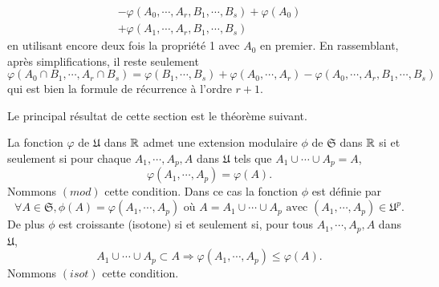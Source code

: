 \begin{demo}
\begin{enumerate}
\begin{align*}
       - \varphi(A_0, \cdots, A_r,B_1, \cdots, B_s) + \varphi(A_0) \\
       + \varphi(A_1, \cdots, A_r,B_1, \cdots, B_s)
    \end{align*}
    en utilisant encore deux fois la propriété 1 avec $A_0$ en premier. En rassemblant, après simplifications, il reste seulement
    \begin{displaymath}
      \varphi(A_0\cap B_1, \cdots, A_r \cap B_s)
      = \varphi( B_1, \cdots , B_s) + \varphi(A_0, \cdots, A_r) - \varphi(A_0, \cdots, A_r,B_1, \cdots, B_s)
    \end{displaymath}
    qui est bien la formule de récurrence à l'ordre $r+1$.
  \end{enumerate}
\end{demo}
Le principal résultat de cette section est le théorème suivant.
\begin{thm}
  La fonction $\varphi$ de $\mathfrak{U}$ dans $\mathbb{R}$ admet une extension modulaire $\phi$ de $\mathfrak{S}$ dans $\mathbb{R}$ si et seulement si pour chaque $A_1, \cdots,A_p,A$ dans $\mathfrak{U}$ tels que $A_1 \cup \cdots \cup A_p = A$,
  \begin{displaymath}
    \varphi(A_1, \cdots,A_p) = \varphi(A).
  \end{displaymath}
  Nommons $(mod)$ cette condition. Dans ce cas la fonction $\phi$ est définie par
  \begin{displaymath}
    \forall A \in \mathfrak{S}, \phi(A) = \varphi(A_1,\cdots, A_p) \text{ où } A = A_1 \cup \cdots \cup A_p \text{ avec }(A_1,\cdots,A_p) \in \mathfrak{U}^p.
  \end{displaymath}
  De plus $\phi$ est croissante (isotone) si et seulement si, pour tous $A_1, \cdots, A_p, A$ dans $\mathfrak{U}$,
  \begin{displaymath}
    A_1 \cup \cdots \cup A_p \subset A \Rightarrow \varphi(A_1, \cdots, A_p) \leq \varphi(A).
  \end{displaymath}
  Nommons $(isot)$ cette condition.
\end{thm}
